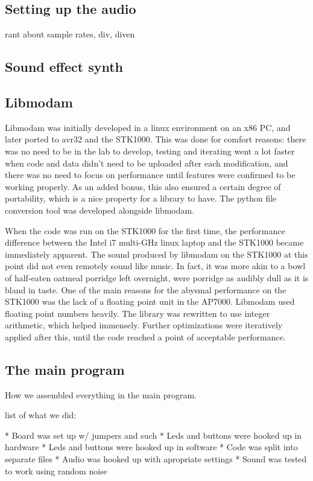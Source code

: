 \subsection{Setting up the audio}
rant about sample rates, div, diven

\subsection{Sound effect synth}

\subsection{Libmodam}

Libmodam was initially developed in a linux environment on an x86 PC, and later ported to avr32 and the STK1000.
This was done for comfort reasons: there was no need to be in the lab to develop, testing and iterating went a lot faster when code and data didn't need to be uploaded after each modification, and there was no need to focus on performance until features were confirmed to be working properly.
As an added bonus, this also ensured a certain degree of portability, which is a nice property for a library to have.
The python file conversion tool was developed alongside libmodam.

When the code was run on the STK1000 for the first time, the performance difference between the Intel i7 multi-GHz linux laptop and the STK1000 became immediately apparent.
The sound produced by libmodam on the STK1000 at this point did not even remotely sound like music.
In fact, it was more akin to a bowl of half-eaten oatmeal porridge left overnight, were porridge as audibly dull as it is bland in taste.
One of the main reasons for the abysmal performance on the STK1000 was the lack of a floating point unit in the AP7000.
Libmodam used floating point numbers heavily.
The library was rewritten to use integer arithmetic, which helped immensely.
Further optimizations were iteratively applied after this, until the code reached a point of acceptable performance.

\subsection{The main program}

How we assembled everything in the main program.


list of what we did:

* Board was set up w/ jumpers and such
* Leds and buttons were hooked up in hardware
* Leds and buttons were hooked up in software
* Code was split into separate files
* Audio was hooked up with apropriate settings
* Sound was tested to work using random noise


